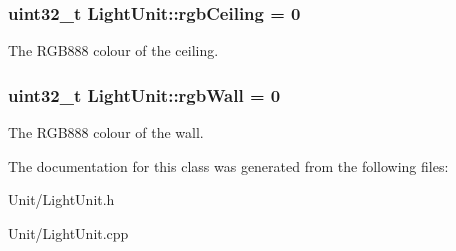 \subsubsection[{\texorpdfstring{rgb\+Ceiling}{rgbCeiling}}]{\setlength{\rightskip}{0pt plus 5cm}uint32\+\_\+t Light\+Unit\+::rgb\+Ceiling = 0}\hypertarget{classLightUnit_ae688f610193b69a2f390bd2a44dc2a7c}{}\label{classLightUnit_ae688f610193b69a2f390bd2a44dc2a7c}
The R\+G\+B888 colour of the ceiling. 
\subsubsection[{\texorpdfstring{rgb\+Wall}{rgbWall}}]{\setlength{\rightskip}{0pt plus 5cm}uint32\+\_\+t Light\+Unit\+::rgb\+Wall = 0}\hypertarget{classLightUnit_a9927e4bcf968e043883688e87935fb4a}{}\label{classLightUnit_a9927e4bcf968e043883688e87935fb4a}
The R\+G\+B888 colour of the wall. 

The documentation for this class was generated from the following files\+:\begin{DoxyCompactItemize}
\item 
Unit/Light\+Unit.\+h\item 
Unit/Light\+Unit.\+cpp\end{DoxyCompactItemize}
